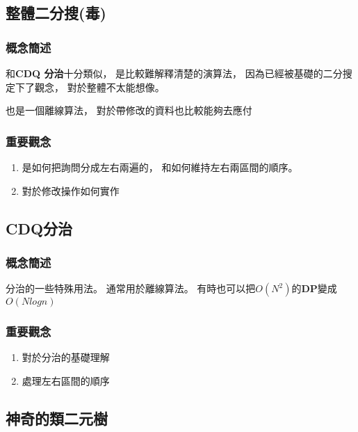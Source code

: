 \documentclass[12pt,oneside]{article}
\begin{document}
\subsection{整體二分搜(毒)}
\subsubsection*{概念簡述}
和\textbf{CDQ 分治}十分類似，
是比較難解釋清楚的演算法，
因為已經被基礎的二分搜定下了觀念，
對於整體不太能想像。

也是一個離線算法，
對於帶修改的資料也比較能夠去應付
\subsubsection*{重要觀念}
\begin{adjustwidth}{2em}{0em}
\begin{enumerate}
    \item
        是如何把詢問分成左右兩遍的，
        和如何維持左右兩區間的順序。
    \item 
        對於修改操作如何實作
\end{enumerate}
\end{adjustwidth}
\clearpage


\subsection{CDQ分治}
\subsubsection*{概念簡述}

分治的一些特殊用法。
通常用於離線算法。
有時也可以把$O(N^2)$的\textbf{DP}變成$O(Nlogn)$

\subsubsection*{重要觀念}
\begin{adjustwidth}{2em}{0em}
\begin{enumerate}
    \item 
        對於分治的基礎理解
    \item 
        處理左右區間的順序
\end{enumerate}
\end{adjustwidth}
\clearpage


\subsection{神奇的類二元樹}
\end{document}
